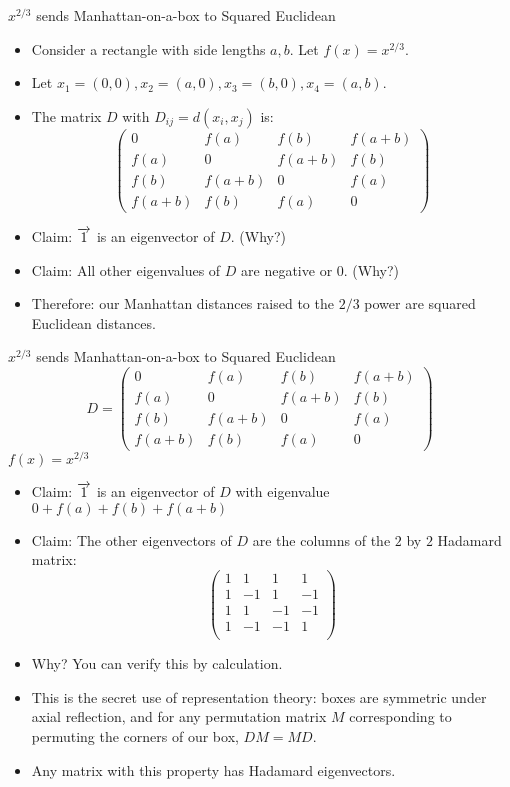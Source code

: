 \begin{frame}{$x^{2/3}$ sends Manhattan-on-a-box to Squared Euclidean}
  \begin{itemize}[<+->]
  \item Consider a rectangle with side lengths $a, b$. Let $f(x) =
  x^{2/3}$.
  \item Let $x_1 = (0, 0), x_2 = (a, 0), x_3 = (b, 0), x_4 = (a, b)$.
  \item The matrix $D$ with $D_{ij} = d(x_i, x_j)$ is:
  \[ \begin{pmatrix}
  0 & f(a) & f(b) & f(a+b)\\
  f(a) & 0 & f(a+b) & f(b)\\
  f(b) & f(a+b) & 0 & f(a)\\
  f(a+b) & f(b) & f(a) & 0
  \end{pmatrix}
  \]
  \item Claim: $\overrightarrow{1}$ is an eigenvector of $D$. (Why?)
  \item Claim: All other eigenvalues of $D$ are negative or $0$. (Why?)
  \item Therefore: our Manhattan distances raised to the $2/3$ power are
  squared Euclidean distances.
  \end{itemize}
\end{frame}

\begin{frame}{$x^{2/3}$ sends Manhattan-on-a-box to Squared Euclidean}
  \[ D = \begin{pmatrix}
  0 & f(a) & f(b) & f(a+b)\\
  f(a) & 0 & f(a+b) & f(b)\\
  f(b) & f(a+b) & 0 & f(a)\\
  f(a+b) & f(b) & f(a) & 0
  \end{pmatrix}
  \]
  $f(x)=x^{2/3}$
  \begin{itemize}[<+->]
  \item Claim: $\overrightarrow{1}$ is an eigenvector of $D$ with eigenvalue $0 +
  f(a)+f(b)+f(a+b)$
  \item Claim: The other eigenvectors of $D$ are the columns of the $2$ by
  $2$ Hadamard matrix:
  \[ \begin{pmatrix}
  1 & 1 & 1 & 1 \\
  1 & -1 & 1 & -1 \\
  1 & 1 & -1 & -1 \\
  1 & -1 & -1 & 1 \\
  \end{pmatrix}
  \]
  \item Why? You can verify this by calculation. 
  \item This is the secret use of representation theory: boxes are
  symmetric under axial reflection, and for any permutation matrix $M$
  corresponding to permuting the corners of our box, $DM = MD$. 
  \item Any matrix with this property has Hadamard eigenvectors.
  \end{itemize}
\end{frame}

